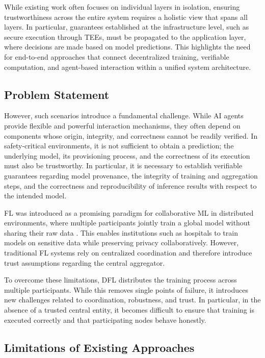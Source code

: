 While existing work often focuses on individual layers in isolation, ensuring trustworthiness across the entire system requires a holistic view that spans all layers. In particular, guarantees established at the infrastructure level, such as secure execution through \acp{TEE}, must be propagated to the application layer, where decisions are made based on model predictions. This highlights the need for end-to-end approaches that connect decentralized training, verifiable computation, and agent-based interaction within a unified system architecture.


\subsection{Problem Statement}

However, such scenarios introduce a fundamental challenge. While \ac{AI} agents provide flexible and powerful interaction mechanisms, they often depend on components whose origin, integrity, and correctness cannot be readily verified. In safety-critical environments, it is not sufficient to obtain a prediction; the underlying model, its provisioning process, and the correctness of its execution must also be trustworthy. In particular, it is necessary to establish verifiable guarantees regarding model provenance, the integrity of training and aggregation steps, and the correctness and reproducibility of inference results with respect to the intended model.

\ac{FL} was introduced as a promising paradigm for collaborative \ac{ML} in distributed environments, where multiple participants jointly train a global model without sharing their raw data \cite{mcmahan2017communication}. This enables institutions such as hospitals to train models on sensitive data while preserving privacy collaboratively. However, traditional \ac{FL} systems rely on centralized coordination and therefore introduce trust assumptions regarding the central aggregator.

To overcome these limitations, \ac{DFL} distributes the training process across multiple participants. While this removes single points of failure, it introduces new challenges related to coordination, robustness, and trust. In particular, in the absence of a trusted central entity, it becomes difficult to ensure that training is executed correctly and that participating nodes behave honestly.

\subsection{Limitations of Existing Approaches}

